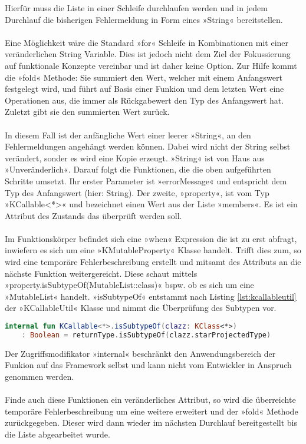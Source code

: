 Hierfür muss die Liste in einer Schleife durchlaufen werden und in jedem Durchlauf die bisherigen Fehlermeldung in Form eines »String« bereitstellen. 
\\\\
Eine Möglichkeit wäre die Standard »for« Schleife in Kombinationen mit einer veränderlichen String Variable. Dies ist jedoch nicht dem Ziel der Fokussierung auf funktionale Konzepte vereinbar und ist daher keine Option. Zur Hilfe kommt die »fold« Methode: Sie summiert den Wert, welcher mit einem Anfangswert festgelegt wird, und führt auf Basis einer Funkion und dem letzten Wert eine Operationen aus, die immer als Rückgabewert den Typ des Anfangswert hat. Zuletzt gibt sie den summierten Wert zurück.
\\\\
In diesem Fall ist der anfängliche Wert einer leerer »String«, an den Fehlermeldungen angehängt werden können. Dabei wird nicht der String selbst verändert, sonder es wird eine Kopie erzeugt. »String« ist von Haus aus »Unveränderlich«. Darauf folgt die Funktionen, die die oben aufgeführten Schritte umsetzt. Ihr erster Parameter ist »errorMessage« und entspricht dem Typ des Anfangswert (hier: String). Der zweite, »property«, ist vom Typ »KCallable<*>« und bezeichnet einen Wert aus der Liste »members«. Es ist ein Attribut des Zustands das überprüft werden soll.
\\\\
Im Funktionskörper befindet sich eine »when« Expression die ist zu erst abfragt, inwiefern es sich um eine »KMutableProperty« Klasse handelt. Trifft dies zum, so wird eine temporäre Fehlerbeschreibung erstellt und mitsamt des Attributs an die nächste Funktion weitergereicht. Diese schaut mittels »property.isSubtypeOf(MutableList::class)« bspw. ob es sich um eine »MutableList« handelt. »isSubtypeOf« entstammt nach Listing
\ref{lst:kcallableutil}
der »KCallableUtil« Klasse und nimmt die Überprüfung des Subtypen vor.
\begin{lstlisting}[caption={KCallableUti}, label={lst:kcallableutil}, language=Kotlin]
internal fun KCallable<*>.isSubtypeOf(clazz: KClass<*>)
	: Boolean = returnType.isSubtypeOf(clazz.starProjectedType)
\end{lstlisting}
\bigskip
Der Zugriffsmodifikator »internal« beschränkt den Anwendungsbereich der Funkion auf das Framework selbst und kann nicht vom Entwickler in Anspruch genommen werden.
\\\\
Finde auch diese Funktionen ein veränderliches Attribut, so wird die überreichte temporäre Fehlerbeschreibung um eine weitere erweitert und der »fold« Methode zurückgegeben. Dieser wird dann wieder im nächsten Durchlauf bereitgestellt bis die Liste abgearbeitet wurde.
